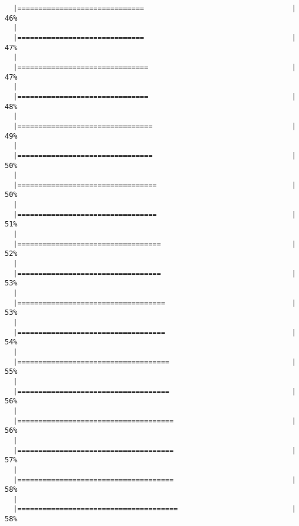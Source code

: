 \begin{knitrout}
\begin{kframe}
\begin{verbatim}
  |==============================                                   |  46%
  |                                                                       
  |==============================                                   |  47%
  |                                                                       
  |===============================                                  |  47%
  |                                                                       
  |===============================                                  |  48%
  |                                                                       
  |================================                                 |  49%
  |                                                                       
  |================================                                 |  50%
  |                                                                       
  |=================================                                |  50%
  |                                                                       
  |=================================                                |  51%
  |                                                                       
  |==================================                               |  52%
  |                                                                       
  |==================================                               |  53%
  |                                                                       
  |===================================                              |  53%
  |                                                                       
  |===================================                              |  54%
  |                                                                       
  |====================================                             |  55%
  |                                                                       
  |====================================                             |  56%
  |                                                                       
  |=====================================                            |  56%
  |                                                                       
  |=====================================                            |  57%
  |                                                                       
  |=====================================                            |  58%
  |                                                                       
  |======================================                           |  58%

\end{verbatim}
\end{kframe}
\end{knitrout}
